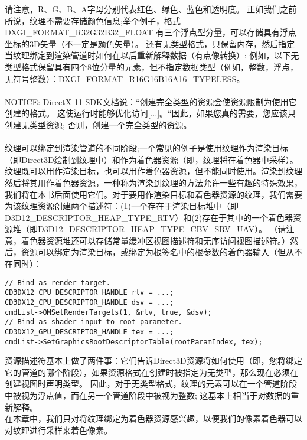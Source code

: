 \begin{flushleft}
请注意，R、G、B、A字母分别代表红色、绿色、蓝色和透明度。 正如我们之前所说，纹理不需要存储颜色信息;举个例子，格式 DXGI\_FORMAT\_R32G32B32\_FLOAT 有三个浮点型分量，可以存储具有浮点坐标的3D矢量（不一定是颜色矢量）。 还有无类型格式，只保留内存，然后指定当纹理绑定到渲染管道时如何在以后重新解释数据（有点像转换）; 例如，以下无类型格式保留具有四个8位分量的元素，但不指定数据类型（例如，整数，浮点，无符号整数）：DXGI\_FORMAT\_R16G16B16A16\_TYPELESS。\\
~\\
NOTICE: DirectX 11 SDK文档说：“创建完全类型的资源会使资源限制为使用它创建的格式。 这使运行时能够优化访问[...]。“因此，如果您真的需要，您应该只创建无类型资源; 否则，创建一个完全类型的资源。\\
~\\
纹理可以绑定到渲染管道的不同阶段;一个常见的例子是使用纹理作为渲染目标（即Direct3D绘制到纹理中）和作为着色器资源（即，纹理将在着色器中采样）。纹理既可以用作渲染目标，也可以用作着色器资源，但不能同时使用。渲染到纹理然后将其用作着色器资源，一种称为渲染到纹理的方法允许一些有趣的特殊效果，我们将在本书后面使用它们。对于要用作渲染目标和着色器资源的纹理，我们需要为该纹理资源创建两个描述符：(1)一个存在于渲染目标堆中（即D3D12\_DESCRIPTOR\_HEAP\_TYPE\_RTV）和(2)存在于其中的一个着色器资源堆（即D3D12\_DESCRIPTOR\_HEAP\_TYPE\_CBV\_SRV\_UAV）。 （请注意，着色器资源堆还可以存储常量缓冲区视图描述符和无序访问视图描述符。）然后，资源可以绑定为渲染目标，或绑定为根签名中的根参数的着色器输入（但从不在同时）：\\
\end{flushleft}

\begin{lstlisting}
// Bind as render target.
CD3DX12_CPU_DESCRIPTOR_HANDLE rtv = ...;
CD3DX12_CPU_DESCRIPTOR_HANDLE dsv = ...;
cmdList->OMSetRenderTargets(1, &rtv, true, &dsv);
// Bind as shader input to root parameter.
CD3DX12_GPU_DESCRIPTOR_HANDLE tex = ...;
cmdList->SetGraphicsRootDescriptorTable(rootParamIndex, tex);
\end{lstlisting}

\begin{flushleft}
资源描述符基本上做了两件事：它们告诉Direct3D资源将如何使用（即，您将绑定它的管道的哪个阶段），如果资源格式在创建时被指定为无类型，那么现在必须在创建视图时声明类型。 因此，对于无类型格式，纹理的元素可以在一个管道阶段中被视为浮点值，而在另一个管道阶段中被视为整数; 这基本上相当于对数据的重新解释。\\
在本章中，我们只对将纹理绑定为着色器资源感兴趣，以便我们的像素着色器可以对纹理进行采样来着色像素。\\
\end{flushleft}

